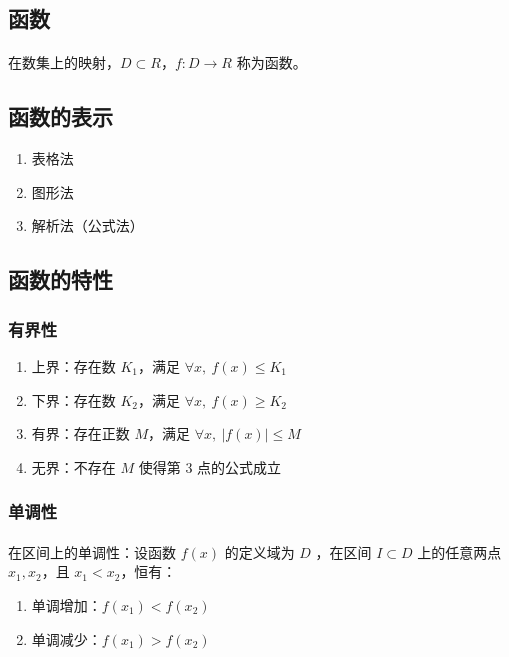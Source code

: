 \subsection{函数}
\paragraph{}
在数集上的映射，$D \subset R$，$f:D \to R$ 称为函数。

\subsection{函数的表示}

\begin{enumerate}
  \item 表格法
  \item 图形法
  \item  解析法（公式法）
\end{enumerate}

\subsection{函数的特性}

\subsubsection{有界性}

\begin{enumerate}
  \item 上界：存在数 $K_1$，满足 $\forall{x},\ f(x) \leq K_1$
  \item 下界：存在数 $K_2$，满足 $\forall{x},\ f(x) \geq K_2$
  \item 有界：存在正数 $M$，满足 $\forall{x},\ |f(x)| \leq M$
  \item 无界：不存在 $M$ 使得第 3 点的公式成立
\end{enumerate}

\subsubsection{单调性}
\paragraph{}
在区间上的单调性：设函数 $f(x)$ 的定义域为 $D$ ，在区间 $I \subset D$ 上的任意两点 $x_1, x_2$，且 $x_1 < x_2$，恒有：

\begin{enumerate}
  \item 单调增加：$f(x_1) < f(x_2)$
  \item 单调减少：$f(x_1) > f(x_2)$
\end{enumerate}

